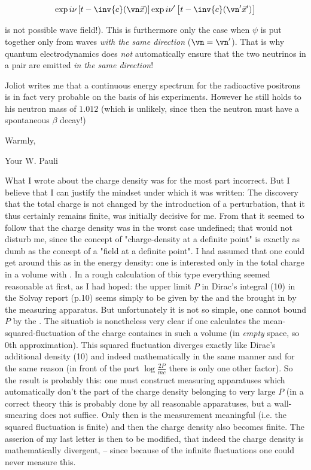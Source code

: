 \documentclass{article}
\newcommand{\nc}[2]{
  \newcommand{#1}{#2}
}
\newcommand{\uequ}[1]{
\begin{align*}
#1
\end{align*}
}
\begin{document}
\nc{\vx}{\vec{x}}

\uequ{
\exp{i\nu\left[t-\inv{c}(\vn\vx)\right]}\exp{i\nu'\left[t-\inv{c}(\vn'\vx')\right]}
}
is not possible wave field!). This is furthermore only the case when $\psi$ is put together only from waves \textit{with the same direction} ($\vn = \vn'$). That is why quantum electrodynamics does \textit{not} automatically ensure that the two neutrinos in a pair are emitted \textit{in the same direction}!

Joliot writes me that a continuous energy spectrum for the radioactive positrons is in fact very probable on the basis of his experiments. However he still holds to his neutron mass of $1.012$ (which is unlikely, since then the neutron must have a spontaneous $\beta$ decay!)

Warmly,

Your W. Pauli

\date{February 13, 1934}

What I wrote about the charge density was for the most part incorrect. But I believe that I can justify the mindset under which it was written: The discovery that the total charge is not changed by the introduction of a perturbation, that it thus certainly remains finite, was initially decisive for me. From that it seemed to follow that the charge density was in the worst case undefined; that would not disturb me, since the concept of "charge-density at a definite point" is exactly as dumb as the concept of a "field at a definite point". I had assumed that one could get around this as in the energy density: one is interested only in the total charge in a volume with . In a rough calculation of tbis type everything seemed reasonable at first, as I had hoped: the upper limit $P$ in Dirac's integral (10) in the Solvay report (p.10) seems simply to be given by the  and the  brought in by the measuring apparatus. But unfortunately it is not so simple, one cannot bound $P$ by the . The situatiob is nonetheless very clear if one calculates the mean-squared-fluctuation of the charge containes in such a volume (in \textit{empty} space, so 0th approximation). This squared fluctuation diverges exactly like Dirac's additional density (10) and indeed mathematically in the same manner and for the same reason (in front of the part $\log{\frac{2P}{mc}}$ there is only one other factor). So the result is probably this: one must construct measuring apparatuses which automatically don't  the part of the charge density belonging to very large $P$ (in a correct theory this is probably done by all reasonable apparatuses, but a wall-smearing does not suffice. Only then is the measurement meaningful (i.e. the squared fluctuation is finite) and then the charge density also becomes finite. The asserion of my last letter is then to be modified, that indeed the charge density is mathematically divergent,  -- since because of the infinite fluctuations one could never measure this.
\end{document}
